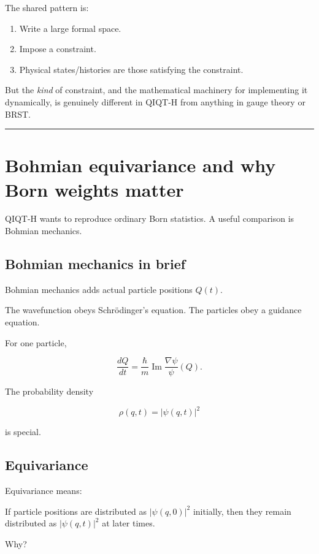 \documentclass[11pt,a4paper]{article}
\newenvironment{qiqtquote}{\begin{mdframed}[style=quotestyle]}{\end{mdframed}}
\begin{document}
The shared pattern is:

\begin{enumerate}
  \item Write a large formal space.
  \item Impose a constraint.
  \item Physical states/histories are those satisfying the constraint.
\end{enumerate}

But the \emph{kind} of constraint, and the mathematical machinery for implementing it dynamically, is genuinely different in QIQT-H from anything in gauge theory or BRST.

\medskip\hrule\medskip

\section{Bohmian equivariance and why Born weights matter}

QIQT-H wants to reproduce ordinary Born statistics. A useful comparison is Bohmian mechanics.

\subsection{Bohmian mechanics in brief}

Bohmian mechanics adds actual particle positions $Q(t)$.

The wavefunction obeys Schrödinger’s equation. The particles obey a guidance equation.

For one particle,

\[
\frac{dQ}{dt}
=
\frac{\hbar}{m}\operatorname{Im}
\frac{\nabla\psi}{\psi}(Q).
\]

The probability density

\[
\rho(q,t)=|\psi(q,t)|^2
\]

is special.

\subsection{Equivariance}

Equivariance means:

\begin{qiqtquote}
If particle positions are distributed as $|\psi(q,0)|^2$ initially, then they remain distributed as $|\psi(q,t)|^2$ at later times.
\end{qiqtquote}

Why?
\end{document}
